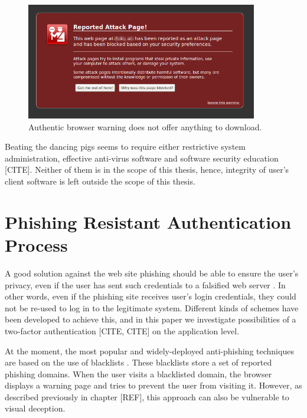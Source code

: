 \documentclass{tktltiki}
\begin{document}
  \begin{figure}
    \centering
    \includegraphics[width=0.9\textwidth]{images/firefox_reported_attack_page_authentic.png}
    \caption{Authentic browser warning does not offer anything to download.}
    
    \label{fig:ff_authentic_warning}
  \end{figure}


    Beating the dancing pigs \cite{schneier_secrets_and_lies_2000} seems to require either restrictive system administration, effective anti-virus software and software security education [CITE]. Neither of them is in the scope of this thesis, hence, integrity of user's client software is left outside the scope of this thesis.

      
      
      
    
\section{Phishing Resistant Authentication Process}

    A good solution against the web site phishing should be able to ensure the user's privacy, even if the user has sent such credentials to a falsified web server \cite{phishing_attacks_and_solutions_2007}. In other words, even if the phishing site receives user's login credentials, they could not be re-used to log in to the legitimate system. Different kinds of schemes have been developed to achieve this, and in this paper we investigate possibilities of a two-factor authentication \cite{NIST_SP800-63, schneier_2factor_2005, google_2step_2010}[CITE, CITE] on the application level.

    At the moment, the most popular and widely-deployed anti-phishing techniques are based on the use of blacklists \cite{visual_similarity_phishing_2008}. These blacklists store a set of reported phishing domains. When the user visits a blacklisted domain, the browser displays a warning page and tries to prevent the user from visiting it. However, as described previously in chapter [REF], this approach can also be vulnerable to visual deception.
\end{document}
